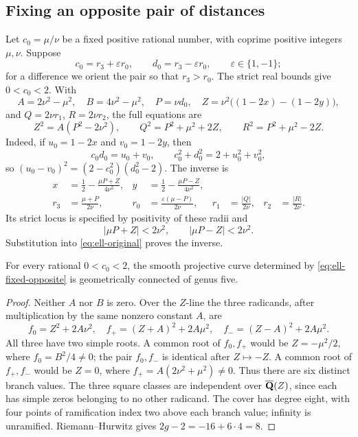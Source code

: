 \subsection{Fixing an opposite pair of distances}

Let $c_0=\mu/\nu$ be a fixed positive rational number, with coprime
positive integers $\mu,\nu$.  Suppose
\[
 c_0=r_3+\varepsilon r_0,\qquad
 d_0=r_3-\varepsilon r_0,\qquad \varepsilon\in\{1,-1\};
\]
for a difference we orient the pair so that $r_3>r_0$.
The strict real bounds give $0<c_0<2$.
With
\[
 A=2\nu^2-\mu^2,\quad B=4\nu^2-\mu^2,\quad
 P=\nu d_0,\quad Z=\nu^2\bigl((1-2x)-(1-2y)\bigr),
\]
and $Q=2\nu r_1$, $R=2\nu r_2$, the full equations are
\begin{equation}\label{eq:ell-fixed-opposite}
 Z^2=A(P^2-2\nu^2),\qquad
 Q^2=P^2+\mu^2+2Z,\qquad R^2=P^2+\mu^2-2Z.
\end{equation}
Indeed, if $u_0=1-2x$ and $v_0=1-2y$, then
\[
 c_0d_0=u_0+v_0,\qquad
 c_0^2+d_0^2=2+u_0^2+v_0^2,
\]
so $(u_0-v_0)^2=(2-c_0^2)(d_0^2-2)$.
The inverse is
\begin{equation}\label{eq:ell-fixed-opposite-return}
 \begin{aligned}
 x&=\frac12-\frac{\mu P+Z}{4\nu^2},&
 y&=\frac12-\frac{\mu P-Z}{4\nu^2},\\
 r_3&=\frac{\mu+P}{2\nu},&
 r_0&=\frac{\varepsilon(\mu-P)}{2\nu},&
 r_1&=\frac{|Q|}{2\nu},&r_2&=\frac{|R|}{2\nu}.
 \end{aligned}
\end{equation}
Its strict locus is specified by positivity of these radii and
\begin{equation}\label{eq:ell-fixed-strict}
 |\mu P+Z|<2\nu^2,\qquad |\mu P-Z|<2\nu^2.
\end{equation}
Substitution into \eqref{eq:ell-original} proves the inverse.

\begin{proposition}\label{prop:ell-opposite-genus}
For every rational $0<c_0<2$, the smooth projective curve determined
by \eqref{eq:ell-fixed-opposite} is geometrically connected of genus five.
\end{proposition}
\begin{proof}
Neither $A$ nor $B$ is zero.  Over the $Z$-line the three radicands,
after multiplication by the same nonzero constant $A$, are
\[
 f_0=Z^2+2A\nu^2,\quad
 f_+=(Z+A)^2+2A\mu^2,\quad
 f_-=(Z-A)^2+2A\mu^2.
\]
All three have two simple roots.  A common root of $f_0,f_+$
would be $Z=-\mu^2/2$, where $f_0=B^2/4\ne0$;
the pair $f_0,f_-$ is identical after $Z\mapsto-Z$.
A common root of $f_+,f_-$ would be $Z=0$, where
$f_+=A(2\nu^2+\mu^2)\ne0$.
Thus there are six distinct branch values.  The three square classes
are independent over $\overline{\mathbf Q}(Z)$, since each has simple zeros
belonging to no other radicand.  The cover has degree eight, with
four points of ramification index two above each branch value;
infinity is unramified.  Riemann--Hurwitz gives
$2g-2=-16+6\cdot4=8$.
\end{proof}

